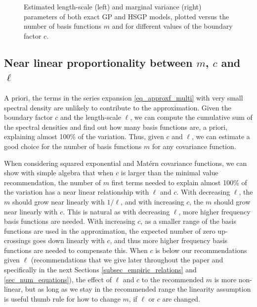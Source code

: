 \begin{figure} %
\centering
{}
\caption{Estimated length-scale (left) and marginal variance (right) parameters of both exact GP and HSGP models, plotted versus the number of basis functions $m$ and for different values of the boundary factor $c$.}
\label{fig4_lscale_vs_J}
\end{figure}

\subsection{Near linear proportionality between $m$, $c$ and $\ell$} \label{subsec_theoretic_linearity}

A priori, the terms in the series expansion \eqref{eq_approxf_multi} with very small spectral density are unlikely to contribute to the approximation. Given the boundary factor $c$ and the length-scale $\ell$, we can compute the cumulative sum of the spectral densities and find out how many basis functions are, a priori, explaining almost 100\% of the variation. Thus, given $c$ and $\ell$, we can estimate a good choice for the number of basis functions $m$ for any covariance function.

When considering squared exponential and Mat{\'e}rn covariance functions, we can show with simple algebra that when $c$ is larger than the minimal value recommendation, the number of $m$ first terms needed to explain almost 100\% of the variation has a near linear relationship with $\ell$ and $c$. With decreasing $\ell$, the $m$ should grow near linearly with $1/\ell$, and with increasing $c$, the $m$ should grow near linearly with $c$.
%
This is natural as with decreasing $\ell$, more higher frequency basis functions are needed. With increasing $c$, as a smaller range of the basis functions are used in the approximation, the expected number of zero up-crossings goes down linearly with $c$, and thus more higher frequency basis functions are needed to compensate this.
%
When $c$ is below our recommendations given $\ell$ (recommendations that we give later throughout the paper and specifically in the next Sections \ref{subsec_empiric_relations} and \ref{sec_num_equations}), the effect of $\ell$ and $c$ to the recommended $m$ is more non-linear, but as long as we stay in the recommended range the linearity assumption is useful thumb rule for how to change $m$, if $\ell$ or $c$ are changed.

